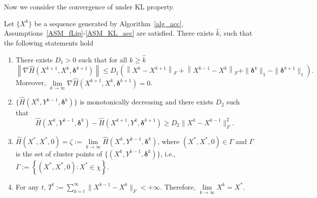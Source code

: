 \documentclass[twoside,11pt]{article}
\numberwithin{equation}{section}
\begin{document}
 
















 Now we consider the convergence of under KL property.
 \begin{lemma} \label{lem_KLacc_cvgc_cond} 
   Let $\{X^{k}\} $ be a sequence generated by Algorithm~\ref{alg_acc}, Assumptions~\ref{ASM_fLip}-\ref{ASM_KL_acc} are satisfied. There exists  $\hat{k} $, such that the following statements hold
   \begin{enumerate}[label={(\roman*).}, leftmargin=*]
     \item There exists $D_{1}>0 $ such that for all $k\ge\hat{k} $
     \begin{equation*}
       \left\| \nabla \hat{H} (X^{k+1},X^{k},\bm{\delta}^{k+1} )\right\|  
       \le D_{1}  \left(\left\|X^{k}-X^{k+1}\right\|_{F}+\left\|X^{k-1}-X^{k}\right\|_{F} + \|\bm{\delta}^{k}\|_{1}-\|\bm{\delta}^{k+1}\|_{1} \right). 
     \end{equation*}
    Moreover, $\lim\limits_{k\to\infty} \nabla \hat{H} (X^{k+1},X^{k},\bm{\delta}^{k+1} )    =0 $.
     \item $\{\hat{H} (X^{k},Y^{k-1},\bm{\delta}^{k})\} $ is monotonically decreasing and there exists $D_{2} $ such that 
     \begin{equation*}
       \hat{H} (X^{k},Y^{k-1},\bm{\delta}^{k} ) - \hat{H} (X^{k+1},Y^{k},\bm{\delta}^{k+1} ) \ge D_{2} \|X^{k}-X^{k-1}\|_{F}^{2}.
     \end{equation*}
     \item $\hat{H} (X^{*},X^{*},0 ) =\zeta :=\lim\limits_{k\to\infty} \hat{H} (X^{k},Y^{k-1},\bm{\delta}^{k} ) $,  where $ (X^{*},X^{*},0 )\in\Gamma $ and $\Gamma $ is the set of cluster points of $\{ (X^{k},Y^{k-1},\bm{\delta}^{k} )\} $, {i.e.}, $\Gamma:=\left\{ (X^{*},X^{*},0 ): X^{*}\in\chi \right\} $.  
     \item For any $t$,  $T^ t := \sum\limits_{k=t}^{\infty}\|X^{k-1}-X^{k}\|_{F} < +\infty $.  Therefore,  $\lim\limits_{k\to\infty} X^k = X^*$. 
   \end{enumerate}
 \end{lemma}
\end{document}
